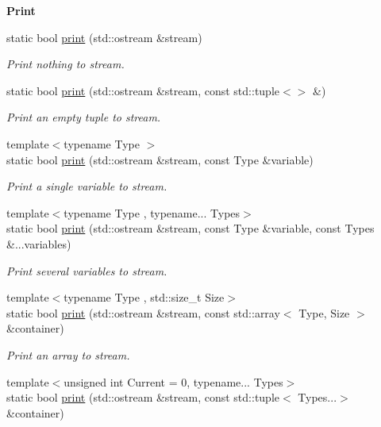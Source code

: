 \begin{Indent}{\bf Print}\par
\begin{DoxyCompactItemize}
\item 
static bool \hyperlink{exceptionmagrathea_1_1DataHandler_a1e2ce163626bd93089e4f06ad7402eb5}{print} (std\-::ostream \&stream)
\begin{DoxyCompactList}\small\item\em Print nothing to stream. \end{DoxyCompactList}\item 
static bool \hyperlink{exceptionmagrathea_1_1DataHandler_a3517e714a8fb5b5e3bf426fb3a2b9e60}{print} (std\-::ostream \&stream, const std\-::tuple$<$$>$ \&)
\begin{DoxyCompactList}\small\item\em Print an empty tuple to stream. \end{DoxyCompactList}\item 
{\footnotesize template$<$typename Type $>$ }\\static bool \hyperlink{exceptionmagrathea_1_1DataHandler_a47a27564c6dc2ed89a013300f9fca57a}{print} (std\-::ostream \&stream, const Type \&variable)
\begin{DoxyCompactList}\small\item\em Print a single variable to stream. \end{DoxyCompactList}\item 
{\footnotesize template$<$typename Type , typename... Types$>$ }\\static bool \hyperlink{exceptionmagrathea_1_1DataHandler_a0e0717030f561af1bd430228d2344c52}{print} (std\-::ostream \&stream, const Type \&variable, const Types \&...variables)
\begin{DoxyCompactList}\small\item\em Print several variables to stream. \end{DoxyCompactList}\item 
{\footnotesize template$<$typename Type , std\-::size\-\_\-t Size$>$ }\\static bool \hyperlink{exceptionmagrathea_1_1DataHandler_a0a368733a11174f5cd268e7ccdd060d9}{print} (std\-::ostream \&stream, const std\-::array$<$ Type, Size $>$ \&container)
\begin{DoxyCompactList}\small\item\em Print an array to stream. \end{DoxyCompactList}\item 
{\footnotesize template$<$unsigned int Current = 0, typename... Types$>$ }\\static bool \hyperlink{exceptionmagrathea_1_1DataHandler_a9b3a922b97c206664e1333240e82d9e2}{print} (std\-::ostream \&stream, const std\-::tuple$<$ Types...$>$ \&container)
$$
\end{DoxyCompactItemize}
\end{Indent}
